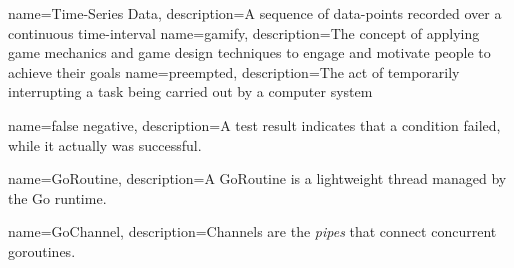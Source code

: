  {
  name=Time-Series Data, description={A sequence of data-points recorded over a
  continuous time-interval}
}
 {
  name=gamify, description={The concept of applying game mechanics and game
  design techniques to engage and motivate people to achieve their goals}
}
 {
  name=preempted, description={The act of temporarily interrupting a task being
  carried out by a computer system}
}

 { name=false negative, description={A test
result indicates that a condition failed, while it actually was successful.} }

 { name=GoRoutine, description={A GoRoutine is a
lightweight thread managed by the Go runtime.} }

 { name=GoChannel, description={Channels are the \emph{pipes} that connect concurrent goroutines.}}
